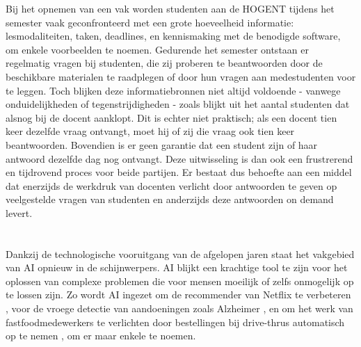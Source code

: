 Bij het opnemen van een vak worden studenten aan de HOGENT tijdens het semester vaak geconfronteerd met een grote hoeveelheid informatie: lesmodaliteiten, taken, deadlines, en kennismaking met de benodigde software, om enkele voorbeelden te noemen. Gedurende het semester ontstaan er regelmatig vragen bij studenten, die zij proberen te beantwoorden door de beschikbare materialen te raadplegen of door hun vragen aan medestudenten voor te leggen. Toch blijken deze informatiebronnen niet altijd voldoende - vanwege onduidelijkheden of tegenstrijdigheden - zoals blijkt uit het aantal studenten dat alsnog bij de docent aanklopt. Dit is echter niet praktisch; als een docent tien keer dezelfde vraag ontvangt, moet hij of zij die vraag ook tien keer beantwoorden. Bovendien is er geen garantie dat een student zijn of haar antwoord dezelfde dag nog ontvangt. Deze uitwisseling is dan ook een frustrerend en tijdrovend proces voor beide partijen. Er bestaat dus behoefte aan een middel dat enerzijds de werkdruk van docenten verlicht door antwoorden te geven op veelgestelde vragen van studenten en anderzijds deze antwoorden on demand levert. 

\section{}%
\label{sec:onderzoeksvraag}


Dankzij de technologische vooruitgang van de afgelopen jaren staat het vakgebied van \acrfull{AI} opnieuw in de schijnwerpers. \acrlong{AI} blijkt een krachtige tool te zijn voor het oplossen van complexe problemen die voor mensen moeilijk of zelfs onmogelijk op te lossen zijn. Zo wordt \acrshort{AI} ingezet om de \gls{recommender} van Netflix te verbeteren \autocite{Steck2021}, voor de vroege detectie van aandoeningen zoals Alzheimer \autocite{Lewis2024}, en om het werk van fastfoodmedewerkers te verlichten door bestellingen bij drive-thrus automatisch op te nemen \autocite{Kinnear2024}, om er maar enkele te noemen.

